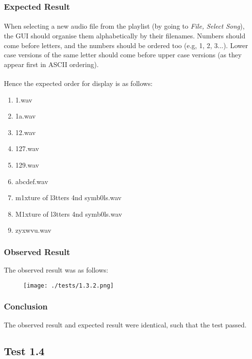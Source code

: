 \subsubsection*{Expected Result}
\paragraph{}
When selecting a new audio file from the playlist (by going to \textit{File, Select Song}), the GUI should organise them alphabetically by their filenames. Numbers should come before letters, and the numbers should be ordered too (e.g, 1, 2, 3...). Lower case versions of the same letter should come before upper case versions (as they appear first in ASCII ordering).
\paragraph{}
Hence the expected order for display is as follows:
\begin{enumerate}
	\item 1.wav
	\item 1a.wav
	\item 12.wav
	\item 127.wav
	\item 129.wav
	\item abcdef.wav
	\item m1xture of l3tters 4nd symb0ls.wav
	\item M1xture of l3tters 4nd symb0ls.wav
	\item zyxwvu.wav
\end{enumerate}

\subsubsection*{Observed Result}
\label{sec:evidence1.3}
The observed result was as follows:
\begin{figure}[H]
	\texttt{[image: ./tests/1.3.2.png]}
\end{figure}

\subsubsection*{Conclusion}
The observed result and expected result were identical, such that the test passed.


\pagebreak
\subsection{Test 1.4}

